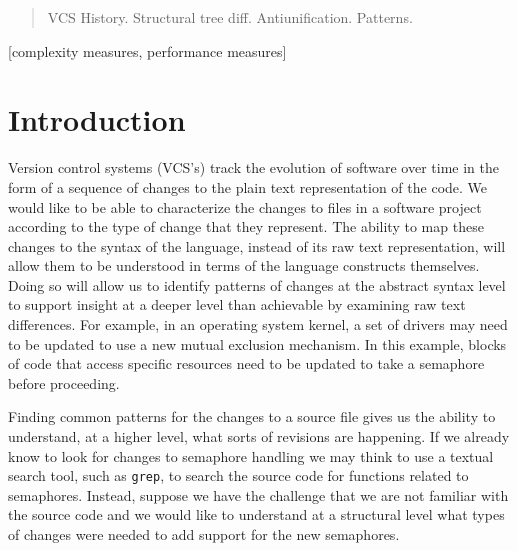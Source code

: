 \documentclass{acm_proc_article-sp}
\begin{document}
\maketitle
\begin{abstract}
VCS History. Structural tree diff. Antiunification. Patterns.
\end{abstract}

[complexity measures, performance measures]



\section{Introduction}

Version control systems (VCS's) track the evolution of software over time in the form
of a sequence of changes to the plain text representation of the code.
We would like to be able to characterize the changes to files in a software
project according to the type of change that they represent.  The ability to
map these changes to the syntax of the language, instead of its raw text
representation, will allow them to be understood in terms of the language
constructs themselves.  Doing so will allow us to identify patterns of
changes at the abstract syntax level to support insight at a deeper level
than achievable by examining raw text differences.  For example, in
an operating system kernel, a set of drivers may need to be updated to use a
new mutual exclusion mechanism. In this example, blocks of code that access
specific resources need to be updated to take a semaphore before proceeding.

Finding common patterns for the changes to a source file gives us the ability
to understand, at a higher level, what sorts of revisions are happening. If we
already know to look for changes to semaphore handling we may think to use a
textual search tool, such as {\tt grep}, to search the source code for
functions related to semaphores. Instead, suppose we have the challenge that we
are not familiar with the source code and we would like to understand at a
structural level what types of changes were needed to add support for the new
semaphores.
\end{document}
